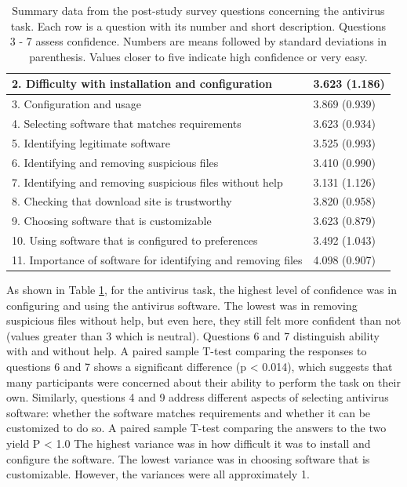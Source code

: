 \begin{table}[tpb]
\caption{Summary data from the post-study survey questions concerning the antivirus task. Each
row is a question with its number and short description. Questions 3 - 7 assess confidence. Numbers are means followed by standard deviations in parenthesis. Values closer to five indicate high confidence or very easy.}
\label{tab:postavefficacy}
\begin{tabular}{|ll|}
\hline
2. Difficulty with installation and configuration             & 3.623 (1.186) \\ \hline
3. Configuration and usage                                    & 3.869 (0.939) \\ \hline
4. Selecting software that matches requirements               & 3.623 (0.934) \\ \hline
5. Identifying legitimate software                            & 3.525 (0.993) \\ \hline
6. Identifying and removing suspicious files                  & 3.410 (0.990) \\ \hline
7. Identifying and removing suspicious files without help      & 3.131 (1.126) \\ \hline
8. Checking that download site is trustworthy                 & 3.820 (0.958) \\ \hline
9. Choosing software that is customizable                     & 3.623 (0.879) \\ \hline
10. Using software that is configured to preferences          & 3.492 (1.043) \\ \hline
11. Importance of software for identifying and removing files & 4.098 (0.907) \\ \hline
\end{tabular}
\end{table}

As shown in Table \ref{tab:postavefficacy}, for the antivirus task, the highest level of confidence was in configuring and using the antivirus software. The lowest was in removing suspicious files without help, but even here, they still felt more confident than not (values greater than 3 which is neutral). Questions 6 and 7 distinguish ability with and without help. A paired sample T-test comparing the responses to questions 6 and 7 shows a significant difference (p < 0.014), which suggests that many participants were concerned about their ability to perform the task on their own. Similarly, questions 4 and 9 address different aspects of selecting antivirus software: whether the software matches requirements and whether
it can be customized to do so. A paired sample T-test comparing the answers to the two yield
P < 1.0 The highest variance was in how difficult it was to install and configure the software. The lowest variance was in choosing software that is customizable. However, the variances were all approximately 1.

